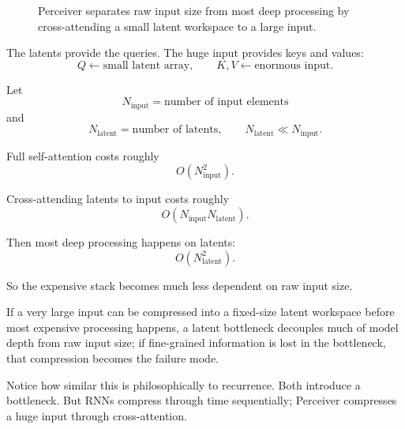 \begin{figure}[htbp]
\centering
{}
\caption{Perceiver separates raw input size from most deep processing by cross-attending a small latent workspace to a large input.}
\label{fig:modern-perceiver-flow}
\end{figure}

The latents provide the queries.
The huge input provides keys and values:
\[
Q\leftarrow\text{small latent array},
\qquad
K,V\leftarrow\text{enormous input}.
\]

Let
\[
N_{\text{input}}=\text{number of input elements}
\]
and
\[
N_{\text{latent}}=\text{number of latents},
\qquad
N_{\text{latent}}\ll N_{\text{input}}.
\]

Full self-attention costs roughly
\[
O(N_{\text{input}}^2).
\]

Cross-attending latents to input costs roughly
\[
O(N_{\text{input}}N_{\text{latent}}).
\]

Then most deep processing happens on latents:
\[
O(N_{\text{latent}}^2).
\]

So the expensive stack becomes much less dependent on raw input size.

\begin{calloutbias}
If a very large input can be compressed into a fixed-size latent workspace before most expensive processing happens, a latent bottleneck decouples much of model depth from raw input size; if fine-grained information is lost in the bottleneck, that compression becomes the failure mode.
\end{calloutbias}

Notice how similar this is philosophically to recurrence.
Both introduce a bottleneck.
But RNNs compress through time sequentially; Perceiver compresses a huge input through cross-attention.

